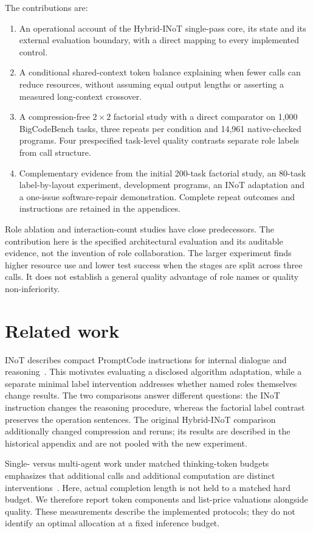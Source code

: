 The contributions are:
\begin{enumerate}
\item An operational account of the Hybrid-INoT single-pass core, its state and its external evaluation boundary, with a direct mapping to every implemented control.
\item A conditional shared-context token balance explaining when fewer calls can reduce resources, without assuming equal output lengths or asserting a measured long-context crossover.
\item A compression-free $2\times2$ factorial study with a direct comparator on 1,000 BigCodeBench tasks, three repeats per condition and 14,961 native-checked programs. Four prespecified task-level quality contrasts separate role labels from call structure.
\item Complementary evidence from the initial 200-task factorial study, an 80-task label-by-layout experiment, development programs, an INoT adaptation and a one-issue software-repair demonstration. Complete repeat outcomes and instructions are retained in the appendices.
\end{enumerate}
Role ablation and interaction-count studies have close predecessors. The contribution here is the specified architectural evaluation and its auditable evidence, not the invention of role collaboration. The larger experiment finds higher resource use and lower test success when the stages are split across three calls. It does not establish a general quality advantage of role names or quality non-inferiority.

\section{Related work}
\label{sec:heldout-related}

INoT describes compact PromptCode instructions for internal dialogue and reasoning~\cite{sun2025inot}. This motivates evaluating a disclosed algorithm adaptation, while a separate minimal label intervention addresses whether named roles themselves change results. The two comparisons answer different questions: the INoT instruction changes the reasoning procedure, whereas the factorial label contrast preserves the operation sentences. The original Hybrid-INoT comparison additionally changed compression and reruns; its results are described in the historical appendix and are not pooled with the new experiment.

Single- versus multi-agent work under matched thinking-token budgets emphasizes that additional calls and additional computation are distinct interventions~\cite{tran2026budget}. Here, actual completion length is not held to a matched hard budget. We therefore report token components and list-price valuations alongside quality. These measurements describe the implemented protocols; they do not identify an optimal allocation at a fixed inference budget.

